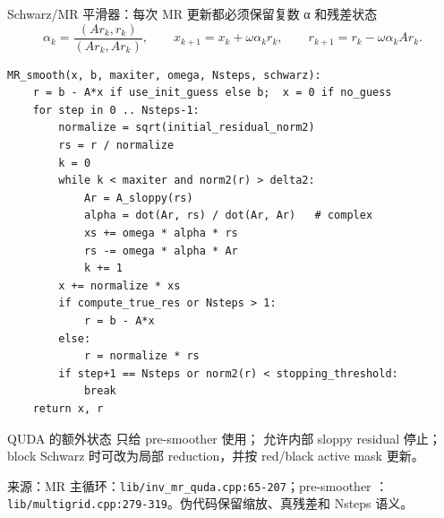 \documentclass[UTF8,aspectratio=169,11pt]{ctexbeamer}
\newcommand{\source}[1]{\vspace{0.05em}\par{\raggedright\scriptsize\color{muted}来源：#1\par}}
\newcommand{\codepath}[1]{\nolinkurl{#1}}
\begin{document}
\begin{frame}[fragile,t]{Schwarz/MR 平滑器：每次 MR 更新都必须保留复数 α 和残差状态}
  \begin{equation*}
    \alpha_k=\frac{(A r_k,r_k)}{(A r_k,A r_k)},
    \qquad
    x_{k+1}=x_k+\omega\alpha_k r_k,
    \qquad
    r_{k+1}=r_k-\omega\alpha_k A r_k.
  \end{equation*}
  \begin{lstlisting}[firstnumber=1]
MR_smooth(x, b, maxiter, omega, Nsteps, schwarz):
    r = b - A*x if use_init_guess else b;  x = 0 if no_guess
    for step in 0 .. Nsteps-1:
        normalize = sqrt(initial_residual_norm2)
        rs = r / normalize
        k = 0
        while k < maxiter and norm2(r) > delta2:
            Ar = A_sloppy(rs)
            alpha = dot(Ar, rs) / dot(Ar, Ar)   # complex
            xs += omega * alpha * rs
            rs -= omega * alpha * Ar
            k += 1
        x += normalize * xs
        if compute_true_res or Nsteps > 1:
            r = b - A*x
        else:
            r = normalize * rs
        if step+1 == Nsteps or norm2(r) < stopping_threshold:
            break
    return x, r
  \end{lstlisting}
  \vspace{0.03cm}
  \begin{block}{QUDA 的额外状态}
    \texttt{} 只给 pre-smoother 使用；\texttt{} 允许内部 sloppy residual 停止；block Schwarz 时可改为局部 reduction，并按 red/black active mask 更新。
  \end{block}
  \source{MR 主循环：\codepath{lib/inv_mr_quda.cpp:65-207}；pre-smoother \texttt{\detokenize{return_residual}}：\codepath{lib/multigrid.cpp:279-319}。伪代码保留缩放、真残差和 Nsteps 语义。}
\end{frame}
\end{document}
